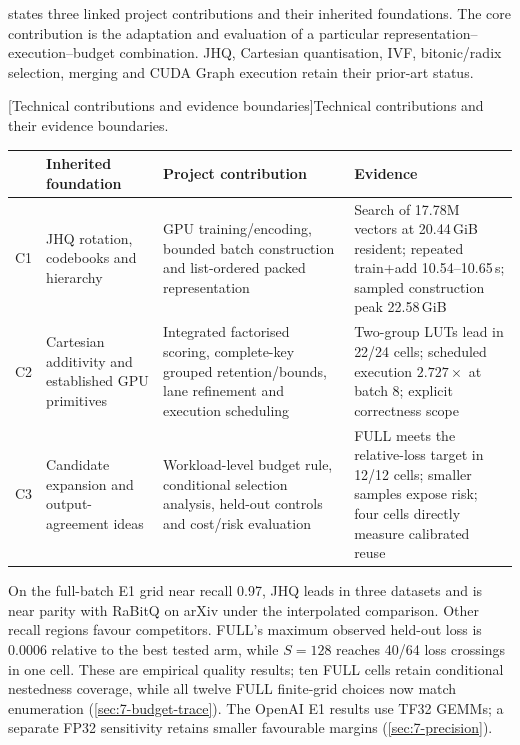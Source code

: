  states three linked project contributions and
their inherited foundations. The core contribution is the adaptation and
evaluation of a particular representation--execution--budget combination.
JHQ, Cartesian quantisation, IVF, bitonic/radix selection, merging and CUDA
Graph execution retain their prior-art status.

\par\medskip\noindent\begin{minipage}{\linewidth}
\centering\captionsetup{hypcap=false}
[Technical contributions and evidence boundaries]{Technical contributions and their evidence boundaries.}
\label{tab:1-contributions}
\footnotesize\setlength{\tabcolsep}{4pt}
\begin{tabularx}{\linewidth}{@{}l*{3}{>{\raggedright\arraybackslash}X}@{}}
\toprule
 & Inherited foundation & Project contribution & Evidence \\
\midrule
C1 & JHQ rotation, codebooks and hierarchy & GPU training/encoding,
bounded batch construction and list-ordered packed representation
& Search of 17.78M vectors at 20.44\,GiB resident; repeated train+add
10.54--10.65\,s; sampled construction peak 22.58\,GiB \\
C2 & Cartesian additivity and established GPU primitives & Integrated
factorised scoring, complete-key grouped retention/bounds, lane refinement
and execution scheduling & Two-group LUTs lead in 22/24 cells;
scheduled execution $2.727\times$ at batch 8; explicit correctness scope \\
C3 & Candidate expansion and output-agreement ideas & Workload-level
budget rule, conditional selection analysis, held-out controls and cost/risk
evaluation & FULL meets the relative-loss target in 12/12 cells;
smaller samples expose risk; four cells directly measure calibrated reuse \\
\bottomrule
\end{tabularx}
\end{minipage}\par\medskip

On the full-batch E1 grid near recall 0.97, JHQ leads in three datasets and is
near parity with RaBitQ on arXiv under the interpolated comparison. Other
recall regions favour competitors. FULL's maximum observed held-out loss is
0.0006 relative to the best tested arm, while $S=128$ reaches 40/64 loss
crossings in one cell. These are empirical quality results; ten FULL cells
retain conditional nestedness coverage, while all twelve FULL
finite-grid choices now match enumeration (\cref{sec:7-budget-trace}).
The OpenAI E1 results use TF32 GEMMs; a separate FP32 sensitivity
retains smaller favourable margins (\cref{sec:7-precision}).

